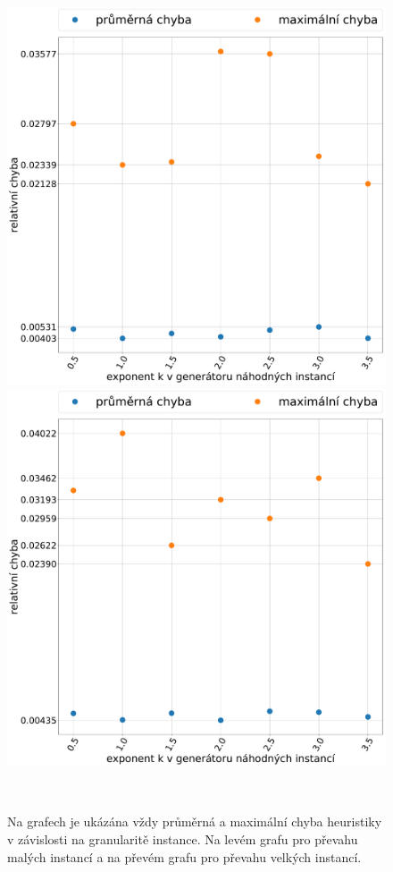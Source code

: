 \documentclass[11pt]{article}
\begin{document}
 \begin{figure}
	\centering
    \begin{minipage}[c]{0.49\textwidth}
        \centering\includegraphics[width=\textwidth]{img/GMHE.pdf} 
    \end{minipage}
    \begin{minipage}[c]{0.49\textwidth}
        \centering \includegraphics[width=\textwidth]{img/GVHE.pdf} 
    \end{minipage}
    \\
   \caption{Na grafech je ukázána vždy průměrná a maximální chyba heuristiky v závislosti na granularitě instance. Na levém grafu pro převahu malých instancí a na převém grafu pro převahu velkých instancí.}\label{fig:GOEI}
    \end{figure} 
    
\end{document}
